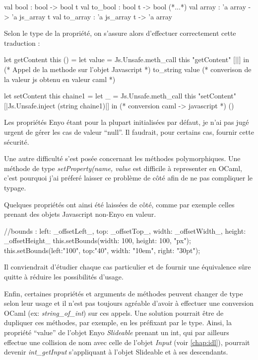 \documentclass[11pt,a4paper]{report}
\begin{document}
\begin{OCaml}
  val bool : bool -> bool t
  val to_bool : bool t -> bool
  (*...*)
  val array : 'a array -> 'a js_array t
  val to_array : 'a js_array t -> 'a array
\end{OCaml}

Selon le type de la propriété, on s'assure alors d'effectuer correctement cette traduction :

\begin{OCaml}
  let getContent this () =
    let value = Js.Unsafe.meth_call 
                     this 
                     "getContent" 
                     [||] in (* Appel de la methode sur l'objet Javascript *)
    to_string value (* converison de la valeur js obtenu en valeur caml *)
\end{OCaml}
\clearpage %
\begin{OCaml}
  let setContent this chaine1 =
    let _ = Js.Unsafe.meth_call 
                this 
                "setContent" 
                [|Js.Unsafe.inject (string chaine1)|] in (* conversion caml -> javascript *)
    ()
\end{OCaml}

Les propriétés Enyo étant pour la plupart initialisées par défaut, je n'ai pas jugé urgent
de gérer les cas de valeur ``null''. Il faudrait, pour certains cas, fournir cette sécurité.\medskip

Une autre difficulté s'est posée concernant les méthodes polymorphiques. Une méthode de type
\emph{setProperty(name, value} est difficile à representer en OCaml, c'est pourquoi j'ai préferé
laisser ce problème de côté afin de ne pas compliquer le typage.

Quelques propriétés ont ainsi été laissées de côté, comme par exemple celles prenant des
objets Javascript non-Enyo en valeur.

\begin{JavaScript}
//bounds : {left: _offsetLeft_, top: _offsetTop_, width: _offsetWidth_, height: _offsetHeight_}
this.setBounds({width: 100, height: 100}, "px");
this.setBounds({left:"100", top:"40", width: "10em", right: "30pt"});
\end{JavaScript}

Il conviendrait d'étudier chaque cas particulier et de fournir une équivalence sûre quitte à
réduire les possibilités d'usage.\medskip

Enfin, certaines propriétés et arguments de méthodes peuvent changer de type selon leur usage 
et il n'est pas toujours agréable d'avoir à effectuer une conversion OCaml (ex: \emph{string\_of\_int})
sur ces appels. Une solution pourrait être de dupliquer ces méthodes, par exemple, en les préfixant 
par le type. Ainsi, la propriété ``value''  de l'objet Enyo \emph{Slideable} prenant un int, qui par ailleurs 
effectue une collision de nom avec celle de l'objet \emph{Input} (voir \ref{chap:idl}), pourrait 
devenir \emph{int\_getInput} s'appliquant à l'objet Slideable et à ses descendants.
\end{document}
